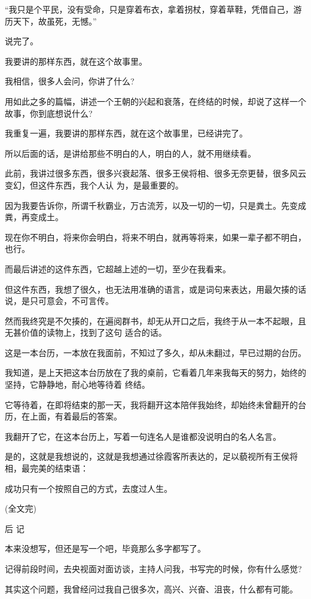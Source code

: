 \documentclass[11pt,a4paper,onecolumn]{article}
\begin{document}
``我只是个平民，没有受命，只是穿着布衣，拿着拐杖，穿着草鞋，凭借自己，游历天下，故虽死，无憾。''

说完了。

我要讲的那样东西，就在这个故事里。

我相信，很多人会问，你讲了什么?

用如此之多的篇幅，讲述一个王朝的兴起和衰落，在终结的时候，却说了这样一个故事，你到底想说什么?

我重复一遍，我要讲的那样东西，就在这个故事里，已经讲完了。

所以后面的话，是讲给那些不明白的人，明白的人，就不用继续看。

此前，我讲过很多东西，很多兴衰起落、很多王侯将相、很多无奈更替，很多风云变幻，但这件东西，我个人认
为，是最重要的。

因为我要告诉你，所谓千秋霸业，万古流芳，以及一切的一切，只是粪土。先变成粪，再变成土。

现在你不明白，将来你会明白，将来不明白，就再等将来，如果一辈子都不明白，也行。

而最后讲述的这件东西，它超越上述的一切，至少在我看来。

但这件东西，我想了很久，也无法用准确的语言，或是词句来表达，用最欠揍的话说，是只可意会，不可言传。

然而我终究是不欠揍的，在遍阅群书，却无从开口之后，我终于从一本不起眼，且无甚价值的读物上，找到了这句
适合的话。

这是一本台历，一本放在我面前，不知过了多久，却从未翻过，早已过期的台历。

我知道，是上天把这本台历放在了我的桌前，它看着几年来我每天的努力，始终的坚持，它静静地，耐心地等待着
终结。

它等待着，在即将结束的那一天，我将翻开这本陪伴我始终，却始终未曾翻开的台历，在上面，有着最后的答案。

我翻开了它，在这本台历上，写着一句连名人是谁都没说明白的名人名言。

是的，这就是我想说的，这就是我想通过徐霞客所表达的，足以藐视所有王侯将相，最完美的结束语：

成功只有一个\myrule 按照自己的方式，去度过人生。

(全文完)

后 记

本来没想写，但还是写一个吧，毕竟那么多字都写了。

记得前段时间，去央视面对面访谈，主持人问我，书写完的时候，你有什么感觉?

其实这个问题，我曾经问过我自己很多次，高兴、兴奋、沮丧，什么都有可能。
\end{document}
